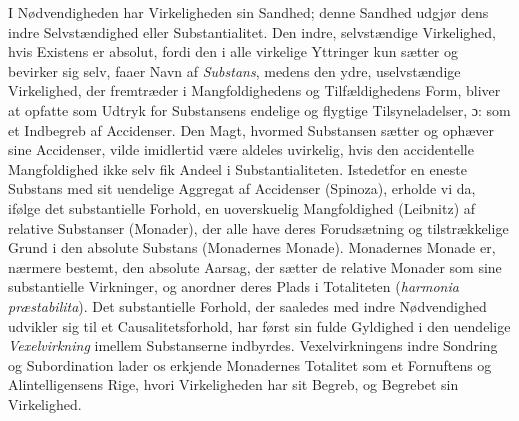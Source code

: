 \documentclass[12pt]{book}
\newcommand{\dsi}{\textup{ɔ:}}
\newcommand{\opage}[1]{\marginnote{\footnotesize\textit{[#1]}}}
\begin{document}
I Nødvendigheden har Virkeligheden sin Sandhed; denne Sandhed udgjør dens indre
Selvstændighed eller Substantialitet. Den indre, selvstændige Virkelighed, hvis
Existens er absolut, fordi den i alle virkelige Yttringer kun sætter og bevirker sig
selv, faaer Navn af \emph{Substans}, medens den ydre, uselvstændige Virkelighed, der
fremtræder i Mangfoldighedens og Tilfældighedens Form, bliver at opfatte som Udtryk for
Substansens endelige og flygtige Tilsyneladelser, \dsi{} som et Indbegreb af
Accidenser. Den Magt, hvormed Substansen sætter og ophæver sine Accidenser, vilde
\opage{160} %
imidlertid være aldeles uvirkelig, hvis den accidentelle Mangfoldighed ikke selv fik
Andeel i Substantialiteten. Istedetfor en eneste Substans med sit uendelige Aggregat af
Accidenser (Spinoza), erholde vi da, ifølge det substantielle Forhold, en uoverskuelig
Mangfoldighed (Leibnitz) af relative Substanser (Monader), der alle have deres
Forudsætning og tilstrækkelige Grund i den absolute Substans (Monadernes Monade).
Monadernes Monade er, nærmere bestemt, den absolute Aarsag, der sætter de relative
Monader som sine substantielle Virkninger, og anordner deres Plads i Totaliteten
(\textit{harmonia præstabilita}). Det substantielle Forhold, der saaledes med indre
Nødvendighed udvikler sig til et Causalitetsforhold, har først sin fulde Gyldighed i
den uendelige \emph{Vexelvirkning} imellem Substanserne indbyrdes. Vexelvirkningens
indre Sondring og Subordination lader os erkjende Monadernes Totalitet som et
Fornuftens og Alintelligensens Rige, hvori Virkeligheden har sit Begreb, og Begrebet
sin Virkelighed.
\end{document}
